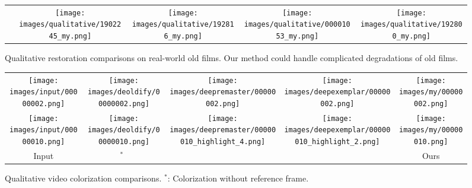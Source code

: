 \documentclass[10pt,twocolumn,letterpaper]{article}
\begin{document}
\begin{figure*}[!tb]
\begin{tabularx}{\textwidth}{ccccc}
			\raisebox{1.9\height}{\rotatebox{90}{Ours}}&
			\texttt{[image: images/qualitative/1902245\_my.png]}&
			\texttt{[image: images/qualitative/192816\_my.png]}&
			\texttt{[image: images/qualitative/00001053\_my.png]}&
			\texttt{[image: images/qualitative/192800\_my.png]}
		\end{tabularx}
		\vspace{-0.7em}
		\caption{{Qualitative restoration comparisons on real-world old films.} Our method could handle complicated degradations of old films.}
		\label{fig:comparison_realold}
		\vspace{-1.75em}
	\end{figure*}
	


	\def\swthree{0.2\linewidth}
	\renewcommand{\tabcolsep}{0.5pt}
	\begin{figure}
		\begin{center}
			\small
			\begin{tabular}{ccccc}
				\vspace{-0.5mm}\texttt{[image: images/input/00000002.png]}&
				\texttt{[image: images/deoldify/00000002.png]}&
				\texttt{[image: images/deepremaster/00000002.png]}&
				\texttt{[image: images/deepexemplar/00000002.png]}&
				\texttt{[image: images/my/00000002.png]}\\
				\texttt{[image: images/input/00000010.png]}&
				\texttt{[image: images/deoldify/00000010.png]}&
				\texttt{[image: images/deepremaster/00000010\_highlight\_4.png]}&
				\texttt{[image: images/deepexemplar/00000010\_highlight\_2.png]}&
				\texttt{[image: images/my/00000010.png]}\\
				Input & \cite{DeOldify}$^{*}$~  & \cite{iizuka2019deepremaster}  & \cite{zhang2019deep} &  Ours\\
			\end{tabular}
		\end{center}
		\vspace{-1.4em}
		\caption{{Qualitative video colorization comparisons.} \cite{DeOldify}$^{*}$: Colorization without reference frame.}
		\vspace{-1.5em}
		\label{fig:colorization_quali}
	\end{figure}
	
\end{document}
